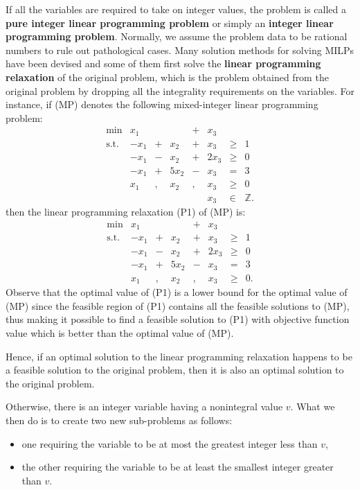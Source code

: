 If all the variables are required to take on integer values, the problem
is called a \textbf{pure integer linear programming problem} or simply an
\textbf{integer linear programming problem}. Normally, we assume the
problem data to be rational numbers to rule out pathological cases.
\newl Many solution methods for solving MILPs have been devised and some of
them first solve the \textbf{linear programming relaxation} of the
original problem, which is the problem obtained from the original
problem by dropping all the integrality requirements on the variables.
\newl For instance, if (MP) denotes the following mixed-integer linear programming problem:
\[\begin{array}{rrcrcrlll}
\min & x_1 &  &  & + & x_3  \\
\mbox{s.t.} & -x_1 & + &  x_2 & + &  x_3  & \geq & 1 \\
& -x_1 & - &  x_2 & + & 2x_3  & \geq & 0 \\
& -x_1 & + & 5x_2 & - &  x_3  & = & 3 \\
&  x_1 & , & x_2 & , & x_3 & \geq & 0 \\
&      &   &     &   & x_3  & \in & \mathbb{Z}. 
\end{array}\]
then the linear programming relaxation (P1) of (MP) is: \[\begin{array}{rrcrcrlll}
\mbox{min} & x_1 &  &  & + & x_3  \\
\text{s.t.} & -x_1 & + &  x_2 & + &  x_3  & \geq & 1 \\
& -x_1 & - &  x_2 & + & 2x_3  & \geq & 0 \\
& -x_1 & + & 5x_2 & - &  x_3  & = & 3 \\
&  x_1 & , & x_2 & , & x_3 & \geq & 0.
\end{array}\]
Observe that the optimal value of (P1) is a lower bound for the optimal value of (MP)
since the feasible region of (P1) contains all the feasible solutions to
(MP), thus making it possible to find a feasible solution to (P1) with
objective function value which is better than the optimal value of (MP). \par Hence,
if an optimal solution to the linear programming relaxation happens to
be a feasible solution to the original problem, then it is also an
optimal solution to the original problem. \par Otherwise, there is an integer
variable having a nonintegral value \(v\). What we then do is to create
two new sub-problems as follows: 
\begin{itemize}[noitemsep]
\item one requiring the variable to be at most the greatest integer less than \(v\), 
\item the other requiring the variable to be at least the smallest integer greater than \(v\).
\end{itemize}
